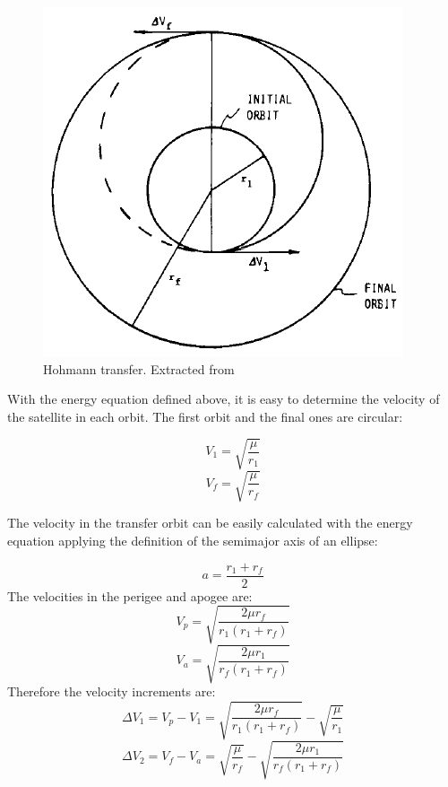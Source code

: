 \begin{figure}
\centerline{\includegraphics[scale=0.7]{Hohmann.png}}
\caption{Hohmann transfer. Extracted from \cite{Chobotov2002}}
\end{figure}

With the energy equation defined above, it is easy to determine the velocity of the satellite in each orbit. The first orbit and the final ones are circular:

\begin{equation}
V_{1}=\sqrt{\frac{\mu}{r_{1}}}
\end{equation}
\begin{equation}
V_{f}=\sqrt{\frac{\mu}{r_{f}}}
\end{equation}

The velocity in the transfer orbit can be easily calculated with the energy equation applying the definition of the semimajor axis of an ellipse:

\begin{equation}
a=\frac{r_{1}+r_{f}}{2}
\end{equation}
The velocities in the perigee and apogee are:
\begin{equation}
V_{p}=\sqrt{\frac{2\mu r_{f}}{r_{1}(r_{1}+r_{f})}}
\end{equation}
\begin{equation}
V_{a}=\sqrt{\frac{2\mu r_{1}}{r_{f}(r_{1}+r_{f})}}
\end{equation}
Therefore the velocity increments are:
\begin{equation}
\Delta V_{1}=V_{p}-V_{1}=\sqrt{\frac{2\mu r_{f}}{r_{1}(r_{1}+r_{f})}}-\sqrt{\frac{\mu}{r_{1}}}
\end{equation}
\begin{equation}
\Delta V_{2}=V_{f}-V_{a}=\sqrt{\frac{\mu}{r_{f}}}-\sqrt{\frac{2\mu r_{1}}{r_{f}(r_{1}+r_{f})}}
\end{equation}


